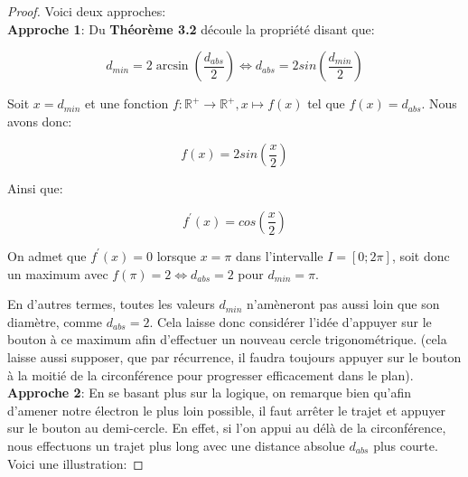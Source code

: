 \documentclass{amsart}
\theoremstyle{definition}
\theoremstyle{remark}
\numberwithin{equation}{section}
\begin{document}
\begin{proof}
  Voici deux approches:\\

  \textbf{Approche 1}: Du \textbf{Théorème 3.2} découle la propriété disant que:

  \[d_{min}=2\arcsin (\frac{d_{abs}}{2}) \Leftrightarrow d_{abs}=2sin(\frac{d_{min}}{2})\]

  Soit $x=d_{min}$ et une fonction $f:\mathbb{R^+}\longrightarrow \mathbb{R^+}, x\longmapsto f(x)$ tel que  $f(x)=d_{abs}$. Nous avons donc:

  \[f(x)=2sin(\frac{x}{2})\]

  Ainsi que:

  \[f^\prime(x)=cos(\frac{x}{2})\]

  On admet que $f^\prime(x)=0$ lorsque $x=\pi$ dans l'intervalle $I=[0;2\pi]$, soit donc un maximum avec $f(\pi)=2 \Leftrightarrow d_{abs}=2$ pour $d_{min}=\pi$.

  En d'autres termes, toutes les valeurs $d_{min}$ n'amèneront pas aussi loin que son diamètre, comme $d_{abs}=2$. Cela laisse donc considérer l'idée d'appuyer sur le bouton à ce maximum afin d'effectuer un nouveau cercle trigonométrique.
  (cela laisse aussi supposer, que par récurrence, il faudra toujours appuyer sur le bouton à la moitié de la circonférence pour progresser efficacement dans le plan).\\

  \textbf{Approche 2}: En se basant plus sur la logique, on remarque bien qu'afin d'amener notre électron le plus loin possible, il faut arrêter le trajet et appuyer sur le bouton
  au demi-cercle. En effet, si l'on appui au délà de la circonférence, nous effectuons un trajet plus long avec une distance absolue $d_{abs}$ plus courte. Voici une illustration:


\end{proof}
\end{document}
